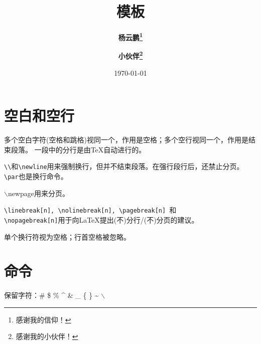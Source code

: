 \documentclass[12pt, a4paper, onecolumn, notitlepage]{article}
\begin{document}
\title{\textbf{\textcolor[rgb]{0.00,1.00,1.00}{\LaTeXe 模板}}}
\author{\textbf{\textcolor[rgb]{1.00,0.00,1.00}{杨云鹏\thanks{感谢我的信仰！}}}\and
        \textbf{\textcolor[rgb]{1.00,1.00,0.00}{小伙伴\thanks{感谢我的小伙伴！}}}
        }
\date{\textcolor[rgb]{0.00,1.00,0.00}{\today}}
\maketitle
\renewcommand{\contentsname}{目 录}
\thispagestyle{headings}
\tableofcontents%
\listoffigures
\listoftables
\section{空白和空行}
多个空白字符(空格和跳格)视同一个，作用是空格；多个空行视同一个，作用是结束段落。 一段中的分行是由\TeX 自动进行的。

\verb+\\+和\verb-\newline-用来强制换行，但并不结束段落。在强行段行后，还禁止分页。
\verb-\par-也是换行命令。

$\backslash${}newpage用来分页。

\verb+\linebreak[n], \nolinebreak[n], \pagebreak[n] +和\\
\verb+\nopagebreak[n]+用于向LaTeX提出(不)分行/(不)分页的建议。

单个换行符视为空格；行首空格被忽略。
\section{命令}
保留字符：\# \$ \% \^{} \& \_ \{ \} \~{} $\backslash${}
\end{document}
